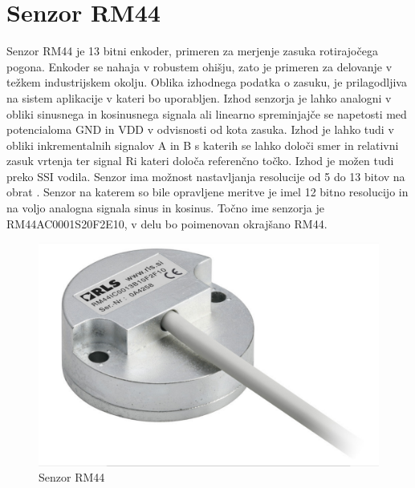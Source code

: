 \chapter{Senzor RM44}
Senzor RM44 je 13 bitni enkoder, primeren za merjenje zasuka rotirajočega pogona\cite{RM44}.
Enkoder se nahaja v robustem ohišju, zato je primeren za delovanje v težkem industrijskem okolju. %
Oblika izhodnega podatka o zasuku, je prilagodljiva na sistem aplikacije v kateri bo uporabljen\cite{Ambrozic}. Izhod senzorja je lahko analogni v obliki sinusnega in kosinusnega signala ali linearno spreminjajče
se napetosti med potencialoma GND in VDD v odvisnosti od kota zasuka.
Izhod je lahko tudi v obliki inkrementalnih signalov A in B s katerih se lahko določi smer in relativni zasuk vrtenja ter signal Ri kateri določa referenčno točko. Izhod je možen tudi preko SSI vodila. Senzor ima
možnost nastavljanja resolucije od 5 do 13 bitov na obrat \cite{AM8192}\cite{RM44}. Senzor na katerem so bile opravljene meritve je imel 12 bitno resolucijo in na voljo analogna signala sinus in kosinus. Točno ime senzorja je
RM44AC0001S20F2E10, v delu bo poimenovan okrajšano RM44.
\begin{figure}[h]
	\centering
	\includegraphics[width=0.6\columnwidth]{./Slike/senzorRM44.jpg}
	\caption{Senzor RM44}
	\label{RM44}
\end{figure}

